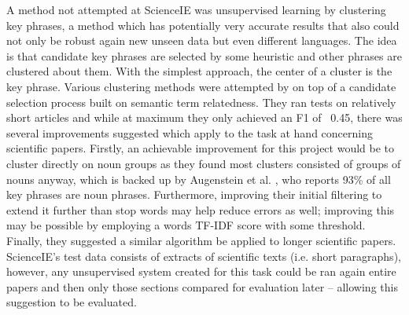 A method not attempted at ScienceIE was unsupervised learning by clustering key phrases, a method which has potentially very accurate results that also could not only be robust again new unseen data but even different languages. The idea is that candidate key phrases are selected by some heuristic and other phrases are clustered about them. With the simplest approach, the center of a cluster is the key phrase. Various clustering methods were attempted by \cite{Liu2009} on top of a candidate selection process built on semantic term relatedness. They ran tests on relatively short articles and while at maximum they only achieved an F1 of ~0.45, there was several improvements suggested which apply to the task at hand concerning scientific papers. Firstly, an achievable improvement for this project would be to cluster directly on noun groups as they found most clusters consisted of groups of nouns anyway, which is backed up by Augenstein et al. \cite{Augenstein2017}, who reports 93\% of all key phrases are noun phrases. Furthermore, improving their initial filtering to extend it further than stop words may help reduce errors as well; improving this may be possible by employing a words TF-IDF score with some threshold. Finally, they suggested a similar algorithm be applied to longer scientific papers. ScienceIE’s test data consists of extracts of scientific texts (i.e. short paragraphs), however, any unsupervised system created for this task could be ran again entire papers and then only those sections compared for evaluation later – allowing this suggestion to be evaluated.
